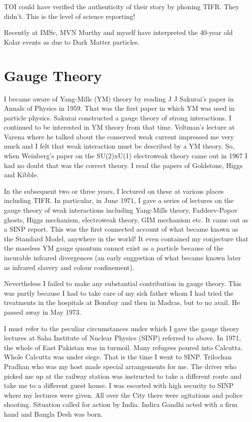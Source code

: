 TOI could have verified the authenticity of their story by phoning TIFR. 
They didn't. This is the level of science reporting!
\medskip

Recently at IMSc, MVN Murthy and myself have interpreted the 40-year old 
Kolar events as due to Dark Matter particles.

\section*{Gauge Theory}

I became aware of Yang-Mills (YM) theory by reading J J Sakurai's paper 
in Annals of Physics in 1959. That was the first paper in which YM was 
used in particle physics. Sakurai constructed a gauge theory of strong 
interactions. I continued to be interested in YM theory from that time. 
Veltman's lecture at Varena where he talked about the conserved weak 
current impressed me very much and I felt that weak interaction must be 
described by a YM theory. So, when Weinberg's paper on the SU(2)xU(1) 
electroweak theory came out in 1967 I had no doubt that was the correct 
theory. I read the papers of Goldstone, Higgs and Kibble.

In the subsequent two or three years, I lectured on these at various 
places including TIFR. In particular, in June 1971, I gave a series of 
lectures on the gauge theory of weak interactions including Yang-Mills 
theory, Faddeev-Popov ghosts, Higgs mechanism, electroweak theory, GIM 
mechanism etc. It came out as a SINP report. This was the first 
connected account of what became known as the Standard Model, anywhere 
in the world! It even contained my conjecture that the massless YM gauge 
quantum cannot exist as a particle because of the incurable infrared 
divergences (an early suggestion of what became known later as infrared 
slavery and colour confinement).

Nevertheless I failed to make any substantial contribution in gauge 
theory. This was partly because I had to take care of my sick father 
whom I had tried the treatments in the hospitals at Bombay and then in 
Madras, but to no avail. He passed away in May 1973.

I must refer to the peculiar circumstances under which I gave the gauge 
theory lectures at Saha Institute of Nuclear Physics (SINP) referred 
to above. In 1971, the whole of East Pakistan was in turmoil. Many 
refugees poured into Calcutta. Whole Calcutta was under siege. That is 
the time I went to SINP. Trilochan Pradhan who was my host made special 
arrangements for me. The driver who picked me up at the railway station 
was instructed to take a different route and take me to a different 
guest house. I was escorted with high security to SINP where my lectures 
were given. All over the City there were agitations and police shooting. 
Situation called for action by India. Indira Gandhi acted with a firm 
hand and Bangla Desh was born.
  

